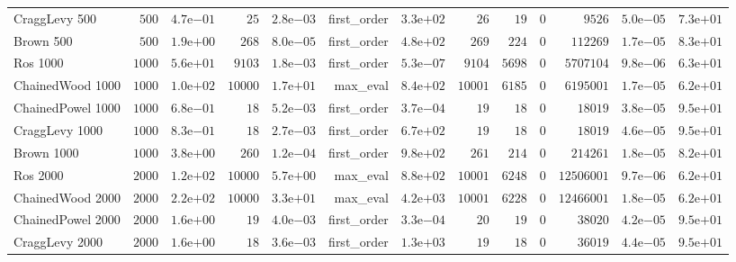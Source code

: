 \begin{longtable}[c]{lrrrrrrrrrrrr}
CraggLevy 500 & \(  500\) & \( 4.7\)e\(-01\) & \(   25\) & \( 2.8\)e\(-03\) & first\_order & \( 3.3\)e\(+02\) & \(   26\) & \(   19\) & \(    0\) & \( 9526\) & \( 5.0\)e\(-05\) & \( 7.3\)e\(+01\) \\
Brown 500 & \(  500\) & \( 1.9\)e\(+00\) & \(  268\) & \( 8.0\)e\(-05\) & first\_order & \( 4.8\)e\(+02\) & \(  269\) & \(  224\) & \(    0\) & \(112269\) & \( 1.7\)e\(-05\) & \( 8.3\)e\(+01\) \\
Ros 1000 & \( 1000\) & \( 5.6\)e\(+01\) & \( 9103\) & \( 1.8\)e\(-03\) & first\_order & \( 5.3\)e\(-07\) & \( 9104\) & \( 5698\) & \(    0\) & \(5707104\) & \( 9.8\)e\(-06\) & \( 6.3\)e\(+01\) \\
ChainedWood 1000 & \( 1000\) & \( 1.0\)e\(+02\) & \(10000\) & \( 1.7\)e\(+01\) & max\_eval & \( 8.4\)e\(+02\) & \(10001\) & \( 6185\) & \(    0\) & \(6195001\) & \( 1.7\)e\(-05\) & \( 6.2\)e\(+01\) \\
ChainedPowel 1000 & \( 1000\) & \( 6.8\)e\(-01\) & \(   18\) & \( 5.2\)e\(-03\) & first\_order & \( 3.7\)e\(-04\) & \(   19\) & \(   18\) & \(    0\) & \(18019\) & \( 3.8\)e\(-05\) & \( 9.5\)e\(+01\) \\
CraggLevy 1000 & \( 1000\) & \( 8.3\)e\(-01\) & \(   18\) & \( 2.7\)e\(-03\) & first\_order & \( 6.7\)e\(+02\) & \(   19\) & \(   18\) & \(    0\) & \(18019\) & \( 4.6\)e\(-05\) & \( 9.5\)e\(+01\) \\
Brown 1000 & \( 1000\) & \( 3.8\)e\(+00\) & \(  260\) & \( 1.2\)e\(-04\) & first\_order & \( 9.8\)e\(+02\) & \(  261\) & \(  214\) & \(    0\) & \(214261\) & \( 1.8\)e\(-05\) & \( 8.2\)e\(+01\) \\
Ros 2000 & \( 2000\) & \( 1.2\)e\(+02\) & \(10000\) & \( 5.7\)e\(+00\) & max\_eval & \( 8.8\)e\(+02\) & \(10001\) & \( 6248\) & \(    0\) & \(12506001\) & \( 9.7\)e\(-06\) & \( 6.2\)e\(+01\) \\
ChainedWood 2000 & \( 2000\) & \( 2.2\)e\(+02\) & \(10000\) & \( 3.3\)e\(+01\) & max\_eval & \( 4.2\)e\(+03\) & \(10001\) & \( 6228\) & \(    0\) & \(12466001\) & \( 1.8\)e\(-05\) & \( 6.2\)e\(+01\) \\
ChainedPowel 2000 & \( 2000\) & \( 1.6\)e\(+00\) & \(   19\) & \( 4.0\)e\(-03\) & first\_order & \( 3.3\)e\(-04\) & \(   20\) & \(   19\) & \(    0\) & \(38020\) & \( 4.2\)e\(-05\) & \( 9.5\)e\(+01\) \\
CraggLevy 2000 & \( 2000\) & \( 1.6\)e\(+00\) & \(   18\) & \( 3.6\)e\(-03\) & first\_order & \( 1.3\)e\(+03\) & \(   19\) & \(   18\) & \(    0\) & \(36019\) & \( 4.4\)e\(-05\) & \( 9.5\)e\(+01\) \\

\end{longtable}
